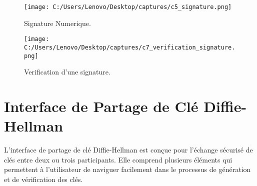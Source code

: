 \documentclass[a4paper,12pt]{report}
\begin{document}
 
  
 
 \begin{figure}[h!]
 	\centering
 	\texttt{[image: C:/Users/Lenovo/Desktop/captures/c5\_signature.png]}
 	\caption{Signature Numerique.}
 \end{figure}
 
 \begin{figure}[h!]
 	\centering
 	\texttt{[image: C:/Users/Lenovo/Desktop/captures/c7\_verification\_signature.png]}
 	\caption{Verification d'une signature.}
 \end{figure}
 
 \clearpage
 
\section{Interface de Partage de Clé Diffie-Hellman}

L'interface de partage de clé Diffie-Hellman est  conçue pour  l'échange sécurisé de clés entre deux ou trois participants. Elle comprend plusieurs éléments  qui permettent à l'utilisateur de naviguer facilement dans le processus de génération et de vérification des clés.
\end{document}
